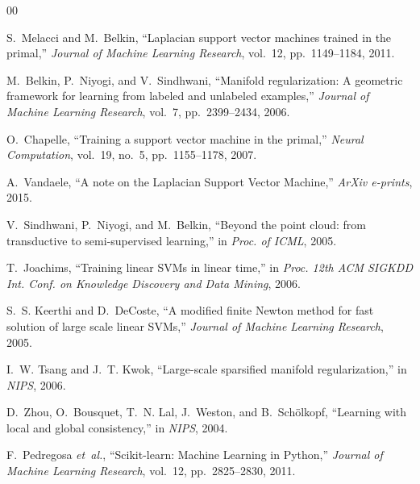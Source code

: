 \documentclass[conference]{IEEEtran}
\begin{document}

\begin{thebibliography}{00}

S.~Melacci and M.~Belkin, ``Laplacian support vector machines trained in the primal,'' \textit{Journal of Machine Learning Research}, vol.~12, pp.~1149--1184, 2011.

M.~Belkin, P.~Niyogi, and V.~Sindhwani, ``Manifold regularization: A geometric framework for learning from labeled and unlabeled examples,'' \textit{Journal of Machine Learning Research}, vol.~7, pp.~2399--2434, 2006.

O.~Chapelle, ``Training a support vector machine in the primal,'' \textit{Neural Computation}, vol.~19, no.~5, pp.~1155--1178, 2007.

A.~Vandaele, ``A note on the Laplacian Support Vector Machine,'' \textit{ArXiv e-prints}, 2015.

V.~Sindhwani, P.~Niyogi, and M.~Belkin, ``Beyond the point cloud: from transductive to semi-supervised learning,'' in \textit{Proc. of ICML}, 2005.

T.~Joachims, ``Training linear SVMs in linear time,'' in \textit{Proc. 12th ACM SIGKDD Int. Conf. on Knowledge Discovery and Data Mining}, 2006.

S.~S. Keerthi and D.~DeCoste, ``A modified finite Newton method for fast solution of large scale linear SVMs,'' \textit{Journal of Machine Learning Research}, 2005.

I.~W. Tsang and J.~T. Kwok, ``Large-scale sparsified manifold regularization,'' in \textit{NIPS}, 2006.

D.~Zhou, O.~Bousquet, T.~N. Lal, J.~Weston, and B.~Schölkopf, ``Learning with local and global consistency,'' in \textit{NIPS}, 2004.

F.~Pedregosa \textit{et~al.}, ``Scikit-learn: Machine Learning in Python,'' \textit{Journal of Machine Learning Research}, vol.~12, pp.~2825--2830, 2011.

\end{thebibliography}
\end{document}
